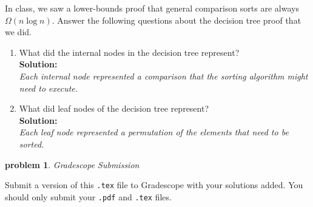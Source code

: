 \documentclass[10pt]{article}
\newtheorem{problem}{\sc\color{cit}problem}
\begin{document}
In class, we saw a lower-bounds proof that general comparison sorts are always $\Omega(n \log n)$. Answer the following questions about the decision tree proof that we did.
    \begin{enumerate}   
    	\item What did the internal nodes in the decision tree represent? \\
    	\textbf{Solution:} \\ \emph{Each internal node represented a comparison that the sorting algorithm might need to execute.}
        \item What did leaf nodes of the decision tree represent? \\
        \textbf{Solution:} \\ \emph{Each leaf node represented a permutation of the elements that need to be sorted.}
    \end{enumerate}

\begin{problem} Gradescope Submission \end{problem}
Submit a version of this \verb|.tex| file to Gradescope with your solutions added.  You should only submit your \verb|.pdf| and \verb|.tex| files.

%
%
\end{document}
